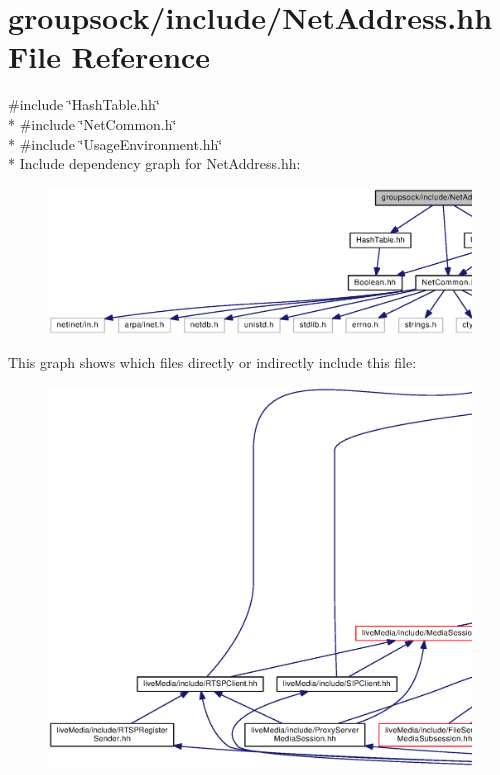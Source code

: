 \section{groupsock/include/\+Net\+Address.hh File Reference}
\label{NetAddress_8hh}
{\ttfamily \#include \char`\"{}Hash\+Table.\+hh\char`\"{}}\\*
{\ttfamily \#include \char`\"{}Net\+Common.\+h\char`\"{}}\\*
{\ttfamily \#include \char`\"{}Usage\+Environment.\+hh\char`\"{}}\\*
Include dependency graph for Net\+Address.\+hh\+:
\nopagebreak
\begin{figure}[H]
\begin{center}
\leavevmode
\includegraphics[width=350pt]{NetAddress_8hh__incl}
\end{center}
\end{figure}
This graph shows which files directly or indirectly include this file\+:
\nopagebreak
\begin{figure}[H]
\begin{center}
\leavevmode
\includegraphics[width=350pt]{NetAddress_8hh__dep__incl}
\end{center}
\end{figure}
